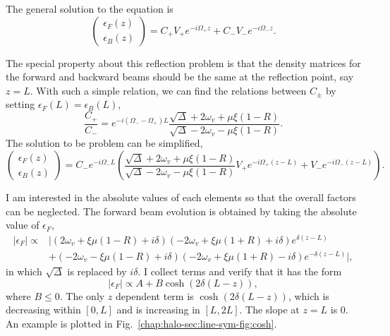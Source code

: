 The general solution to the equation is
\begin{equation*}
   \begin{pmatrix}
   \epsilon_F(z) \\
   \epsilon_B(z)
   \end{pmatrix} = C_+ V_+ e^{-i \Omega_+ z} +  C_- V_- e^{-i \Omega_- z}.
\end{equation*}

The special property about this reflection problem is that the density matrices for the forward and backward beams should be the same at the reflection point, say $z=L$. With such a simple relation, we can find the relations between $C_\pm$ by setting $\epsilon_F(L)=\epsilon_B(L)$,
\begin{equation}
   \frac{C_+}{C_-} = e^{-i(\Omega_- -\Omega_+)L} \frac{ \sqrt{\Delta} +  2\omega_v + \mu \xi (1-R) }{\sqrt{\Delta} -  2\omega_v - \mu \xi (1-R)}.
\end{equation}
The solution to be problem can be simplified,
\begin{equation}
   \begin{pmatrix}
   \epsilon_F(z) \\
   \epsilon_B(z)
   \end{pmatrix} = C_- e^{-i\Omega_- L} \left( \frac{ \sqrt{\Delta} +  2\omega_v + \mu \xi (1-R) }{\sqrt{\Delta} -  2\omega_v - \mu \xi (1-R)} V_+ e^{-i \Omega_+ (z-L)} +  V_- e^{-i \Omega_- (z-L)} \right).
\end{equation}

I am interested in the absolute values of each elements so that the overall factors can be neglected. The forward beam evolution is obtained by taking the absolute value of $\epsilon_F$,
\begin{align*}
   \left\vert \epsilon_F \right\vert \propto & \lvert (2\omega_v +\xi\mu(1-R) +i \delta ) ( -2\omega_v + \xi\mu(1+R) + i \delta ) e^{\delta(z-L)} \\
   &+ ( -2\omega_v - \xi\mu(1-R) +i \delta ) ( -2\omega_v + \xi\mu(1+R) - i \delta ) e^{-\delta(z-L)} \rvert,
\end{align*}
in which $\sqrt{\Delta}$ is replaced by $i \delta$. I collect terms and verify that it has the form
\begin{equation}
   \left\vert \epsilon_F \right\vert \propto A + B \cosh( 2\delta(L-z) ),
\end{equation}
where $B\leq 0$.
The only $z$ dependent term is $\cosh( 2\delta(L-z) )$, which is decreasing within $[0,L]$ and is increasing in $[L,2L]$. The slope at $z=L$ is 0. An example is plotted in Fig.~\ref{chap:halo-sec:line-sym-fig:cosh}.


